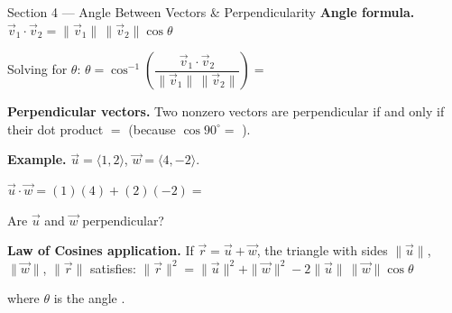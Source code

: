 \documentclass[10pt]{article}
\begin{document}
\begin{notesbox}{Section 4 --- Angle Between Vectors \& Perpendicularity}
\small
\textbf{Angle formula.}
$\vec{v}_1 \cdot \vec{v}_2 = \|\vec{v}_1\|\,\|\vec{v}_2\| \cos\theta$

\vspace{0.08in}
Solving for $\theta$:
\quad $\theta = \cos^{-1}\!\left( \dfrac{\vec{v}_1 \cdot \vec{v}_2}{\|\vec{v}_1\|\,\|\vec{v}_2\|} \right)
= $ \blank{5cm}

\vspace{0.12in}
\textbf{Perpendicular vectors.} Two nonzero vectors are perpendicular if and only if their
dot product $= $ \blank{1.5cm} \quad (because $\cos 90^\circ = $ \blank{1cm}).

\vspace{0.12in}
\textbf{Example.} $\vec{u}=\langle 1,2\rangle$, $\vec{w}=\langle 4,-2\rangle$.

\vspace{0.06in}
\hspace{1em} $\vec{u}\cdot\vec{w} = (1)(4) + (2)(-2) = $ \blank{2cm}

\hspace{1em} Are $\vec{u}$ and $\vec{w}$ perpendicular? \blank{3cm}

\vspace{0.1in}
\textbf{Law of Cosines application.} If $\vec{r} = \vec{u}+\vec{w}$, the triangle with sides
$\|\vec{u}\|$, $\|\vec{w}\|$, $\|\vec{r}\|$ satisfies:
$\|\vec{r}\|^2 = \|\vec{u}\|^2 + \|\vec{w}\|^2 - 2\|\vec{u}\|\,\|\vec{w}\|\cos\theta$

where $\theta$ is the angle \blank{5cm}.
\end{notesbox}
\end{document}
